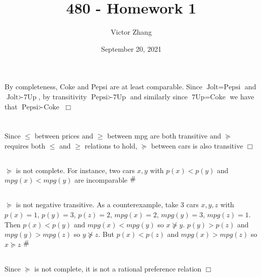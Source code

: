 \documentclass{article}
\title{480 - Homework 1}
\author{Victor Zhang}
\date{September 20, 2021}
\newcommand{\contra}{\raisebox{\depth}{\#}}
\begin{document}
\maketitle

\section{}
By completeness, Coke and Pepsi are at least comparable. Since $\text{Jolt} = \text{Pepsi}$ and $\text{Jolt} \succ \text{7Up}$, by transitivity $\text{Pepsi} \succ \text{7Up}$ and similarly since $\text{7Up} = \text{Coke}$ we have that $\text{Pepsi} \succ \text{Coke}$ $\Box$

\section{}
\subsection{}
Since $\leq$ between prices and $\geq$ between mpg are both transitive and $\succeq$ requires both $\leq$ and $\geq$ relations to hold, $\succeq$ between cars is also transitive $\Box$

\subsection{}
$\succeq$ is not complete. For instance, two cars $x,y$ with $p(x) < p(y)$ and $mpg(x) < mpg(y)$ are incomparable $\contra$

\subsection{}
$\succeq$ is not negative transitive. As a counterexample, take 3 cars $x,y,z$ with $p(x) = 1$, $p(y) = 3$, $p(z) = 2$, $mpg(x) = 2$, $mpg(y) = 3$, $mpg(z) = 1$. Then $p(x) < p(y)$ and $mpg(x) < mpg(y)$ so $x \nsucceq y$. $p(y) > p(z)$ and $mpg(y) > mpg(z)$ so $y \nsucceq z$. But $p(x) < p(z)$ and $mpg(x) > mpg(z)$ so $x \succeq z$ $\contra$

\subsection{}
Since $\succeq$ is not complete, it is not a rational preference relation $\Box$
\end{document}
